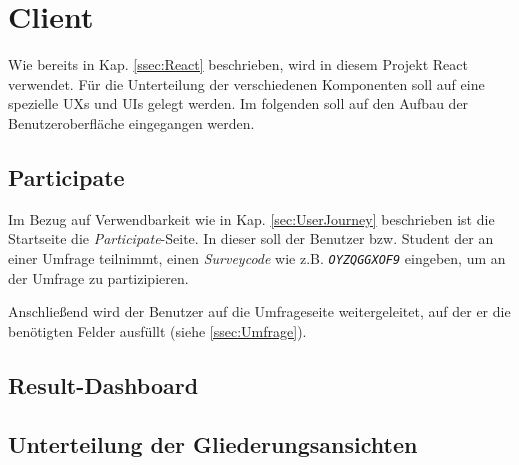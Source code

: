 \section{Client}
\authorsection{\authorSG}

Wie bereits in Kap. \vref{ssec:React} beschrieben, wird in diesem Projekt React verwendet. 
Für die Unterteilung der verschiedenen Komponenten soll auf eine spezielle \acfp{UX} und \acfp{UI} gelegt werden. 
Im folgenden soll auf den Aufbau der Benutzeroberfläche eingegangen werden. 

\subsection{Participate}
Im Bezug auf Verwendbarkeit wie in Kap. \vref{sec:UserJourney} beschrieben ist die Startseite die \emph{Participate}-Seite. 
In dieser soll der Benutzer bzw. Student der an einer Umfrage teilnimmt, einen \emph{Surveycode} wie z.B. \emph{\texttt{OYZQGGXOF9}} eingeben, um an der Umfrage zu partizipieren. 

Anschließend wird der Benutzer auf die Umfrageseite weitergeleitet, auf der er die benötigten Felder ausfüllt (siehe \vref{ssec:Umfrage}).



\subsection{Result-Dashboard}
\label{ssec:ResultDashboard}





\subsection{Unterteilung der Gliederungsansichten}

